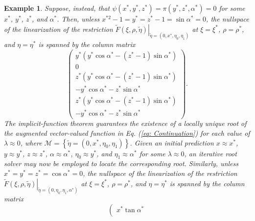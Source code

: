 \documentclass{article}
\newtheorem{example}[theorem]{Example}
\begin{document}
\begin{example}
\label{alpha and y continuation}Suppose, instead, that $\psi \left( x^{\ast
},y^{\ast },z^{\ast }\right) =\pi \left( y^{\ast },z^{\ast },\alpha ^{\ast
}\right) =0$ for some $x^{\ast }$, $y^{\ast }$, $z^{\ast }$, and $\alpha
^{\ast }$. Then, unless $x^{\ast 2}-1=y^{\ast }=z^{\ast }-1=\sin \alpha
^{\ast }=0$, the nullspace of the linearization of the restriction $\left. 
\tilde{F}\left( \xi ,\rho ,\tilde{\eta}\right) \right| _{\tilde{\eta}=\left(
0,x^{\ast },\eta _{0},\eta _{1}\right) }$ at $\xi =\xi ^{\ast }$, $\rho
=\rho ^{\ast }$, and $\eta =\eta ^{\ast }$ is spanned by the column matrix%
\[
\left( 
\begin{array}{c}
y^{\ast }\left( y^{\ast }\cos \alpha ^{\ast }-\left( z^{\ast }-1\right) \sin
\alpha ^{\ast }\right) \\ 
0 \\ 
z^{\ast }\left( y^{\ast }\cos \alpha ^{\ast }-\left( z^{\ast }-1\right) \sin
\alpha ^{\ast }\right) \\ 
-y^{\ast }\cos \alpha ^{\ast }-z^{\ast }\sin \alpha ^{\ast } \\ 
z^{\ast }\left( y^{\ast }\cos \alpha ^{\ast }-\left( z^{\ast }-1\right) \sin
\alpha ^{\ast }\right) \\ 
-y^{\ast }\cos \alpha ^{\ast }-z^{\ast }\sin \alpha ^{\ast }%
\end{array}%
\right) . 
\]%
The implicit-function theorem guarantees the existence of a locally unique
root of the augmented vector-valued function in Eq. (\ref{eq: Continuation})
for each value of $\lambda \approx 0$, where $\mathcal{M}=\left\{ \tilde{\eta%
}=\left( 0,x^{\ast },\eta _{0},\eta _{1}\right) \right\} $. Given an initial
prediction $x\approx x^{\ast }$, $y\approx y^{\ast }$, $z\approx z^{\ast }$, 
$\alpha \approx \alpha ^{\ast }$, $\eta _{0}\approx y^{\ast }$, and $\eta
_{1}\approx \alpha ^{\ast }$ for some $\lambda \approx 0$, an iterative root
solver may now be employed to locate the corresponding root.\newline
\newline
Similarly, unless $x^{\ast }=y^{\ast }=z^{\ast }=\cos \alpha ^{\ast }=0$,
the nullspace of the linearization of the restriction $\left. \tilde{F}%
\left( \xi ,\rho ,\tilde{\eta}\right) \right| _{\tilde{\eta}=\left( 0,\eta
_{0},\eta _{1},\alpha ^{\ast }\right) }$ at $\xi =\xi ^{\ast }$, $\rho =\rho
^{\ast }$, and $\eta =\eta ^{\ast }$ is spanned by the column matrix%
\[
\left( 
\begin{array}{c}
x^{\ast }\tan \alpha ^{\ast } \\ 

\end{array}\]
\end{example}
\end{document}
